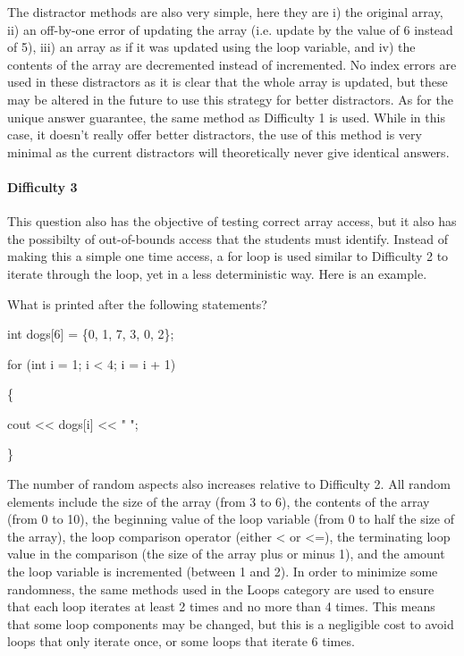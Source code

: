 \documentclass{article}
\begin{document}
The distractor methods are also very simple, here they are i) the original array, ii) an off-by-one error of updating the array (i.e. update by the value of 6 instead of 5), iii) an array as if it was
updated using the loop variable, and iv) the contents of the array are decremented instead of incremented. No index errors are used in these distractors as it is clear that the whole array is 
updated, but these may be altered in the future to use this strategy for better distractors. As for the unique answer guarantee, the same method as Difficulty 1 is used. While in this case, it
doesn't really offer better distractors, the use of this method is very minimal as the current distractors will theoretically never give identical answers. 

\paragraph{Difficulty 3} \hfill \par

This question also has the objective of testing correct array access, but it also has the possibilty of out-of-bounds access that the students must identify. Instead of making this a simple one time
access, a for loop is used similar to Difficulty 2 to iterate through the loop, yet in a less deterministic way. Here is an example.

\hfill \par
What is printed after the following statements? \par
int dogs[6] = \{0, 1, 7, 3, 0, 2\}; \par
for (int i = 1; i \textless{} 4; i = i + 1) \par
\{ \par
\indent\indent cout \textless\textless{} dogs[i] \textless\textless{} " ";\par
\} \par
\hfill \par

The number of random aspects also increases relative to Difficulty 2. All random elements include the size of the array (from 3 to 6), the contents of the array (from 0 to 10), the beginning value
of the loop variable (from 0 to half the size of the array), the loop comparison operator (either \textless{} or \textless{}=), the terminating loop value in the comparison (the size of the array 
plus or minus 1), and the amount the loop variable is incremented (between 1 and 2). In order to minimize some randomness, the same methods used in the Loops category are used to ensure
that each loop iterates at least 2 times and no more than 4 times. This means that some loop components may be changed, but this is a negligible cost to avoid loops that only iterate once, or 
some loops that iterate 6 times.
\end{document}
